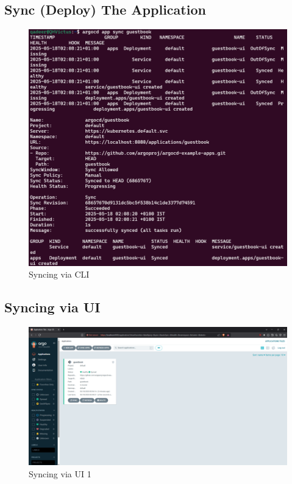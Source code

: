 \documentclass[conference]{IEEEtran}
\begin{document}
\subsection{Sync (Deploy) The Application}
\begin{figure}[htbp]
    \centering
    \includegraphics[width=1\linewidth]{Syncing via CLI.png}
    \caption{Syncing via CLI}
    \label{fig:sync-via-cli}
\end{figure}

\subsection{Syncing via UI}
\begin{figure}[H]
    \centering
    \includegraphics[width=1\linewidth]{Syncing via UI 1.png}
    \caption{Syncing via UI 1}
    \label{fig:sync-via-ui-1}
\end{figure}
\end{document}
